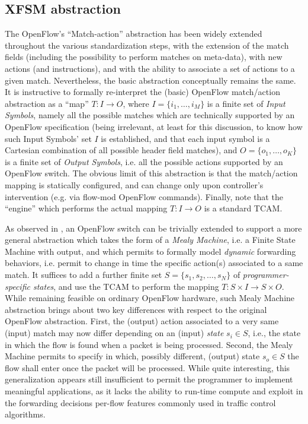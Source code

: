 \documentclass{sig-alternate}
\begin{document}
\subsection{XFSM abstraction}
\label{ss:xfsm}
The OpenFlow's ``Match-action'' abstraction has been widely extended throughout the various standardization steps, with the extension of the match fields (including the possibility to perform matches on meta-data), with new actions (and instructions), and with the ability to associate a set of actions to a given match. Nevertheless, the basic abstraction conceptually remains the same. It is instructive to formally re-interpret the (basic) OpenFlow match/action abstraction as a ``map'' $T : I \rightarrow O$, where $I=\{i_1, \ldots, i_M\}$ is a finite set of {\em Input Symbols}, namely all the possible matches which are technically supported by an OpenFlow specification (being irrelevant, at least for this discussion, to know how such Input Symbols' set $I$ is established, and that each input symbol is a Cartesian combination of all possible header field matches), and $O=\{o_1, \ldots, o_K\}$ is a finite set of {\em Output Symbols}, i.e. all the possible actions supported by an OpenFlow switch. The obvious limit of this abstraction is that the match/action mapping is statically configured, and can change only upon controller's intervention (e.g. via flow-mod OpenFlow commands). Finally, note that the ``engine'' which performs the actual mapping $T : I \rightarrow O$ is a standard TCAM.

As observed in \cite{ccr14}, an OpenFlow switch can be trivially extended to support a more general abstraction which takes the form of a {\em Mealy Machine}, i.e. a Finite State Machine with output,
and which permits to formally model {\em dynamic} forwarding behaviors, i.e. permit to change in time the specific action(s) associated to a same match. It suffices to add a further finite set $S=\{s_1, s_2, …, s_N\}$ of {\em programmer-specific states}, and use the TCAM to perform the mapping $T : S \times I \rightarrow S \times O$. While remaining feasible on ordinary OpenFlow hardware, such Mealy Machine abstraction brings about two key differences with respect to the original OpenFlow abstraction. First, the (output) action associated to a very same (input) match may now differ depending on an (input) {\em state} $s_i \in S$, i.e., the state in which the flow is found when a packet is being processed. Second, the Mealy Machine permits to specify in which, possibly different, (output) state $s_o \in S$ the flow shall enter once the packet will be processed. While quite interesting, this generalization appears still insufficient to permit the programmer to implement meaningful applications, as it lacks the ability to run-time compute and exploit in the forwarding decisions per-flow features commonly used in traffic control algorithms. 
\end{document}
